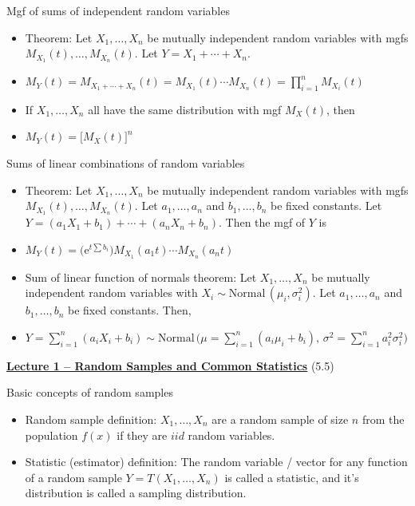 \documentclass{article}
\newcommand{\bu}[1]{\textbf{\ul{#1}}}				%
\newcommand{\e}{\mathrm{e}}		%
\newcommand{\follow}[1]{\sim \text{#1}\,}		%
\newcommand{\vecn}[2]{#1_1, \ldots, #1_{#2}}	%
\begin{document}
Mgf of sums of independent random variables
\begin{itemize}
    \item Theorem: Let $\vecn{X}{n}$ be mutually independent random variables with mgfs $M_{X_1}(t), \ldots, M_{X_n}(t)$. Let $Y = X_1 + \cdots + X_n$.
    \item[] $\displaystyle M_Y(t) = M_{X_1 + \cdots + X_n}(t) = M_{X_1}(t) \cdots M_{X_n}(t) = \prod_{i = 1}^n M_{X_i}(t)$
    \item[] If $\vecn{X}{n}$ all have the same distribution with mgf $M_X(t)$, then
    \item[] $M_Y(t) = \big[M_X(t)\big]^n$
\end{itemize}\bigskip

Sums of linear combinations of random variables
\begin{itemize}
     \item Theorem: Let $\vecn{X}{n}$ be mutually independent random variables with mgfs $M_{X_1}(t), \ldots, M_{X_n}(t)$. Let $\vecn{a}{n}$ and $\vecn{b}{n}$ be fixed constants. Let $Y = (a_1 X_1 + b_1) + \cdots + (a_n X_n + b_n)$. Then the mgf of $Y$ is
     \item[] $M_Y(t) = \big(\e^{t \sum b_i}\big) M_{X_1}(a_1 t) \cdots M_{X_n}(a_n t)$
     \item Sum of linear function of normals theorem: Let $\vecn{X}{n}$ be mutually independent random variables with $X_i \follow{Normal}(\mu_i, \sigma_i^2)$. Let $\vecn{a}{n}$ and $\vecn{b}{n}$ be fixed constants. Then,
     \item[] $\displaystyle Y =\sum_{i = 1}^n (a_i X_i + b_i) \follow{Normal}\bigg(\mu = \sum_{i = 1}^n (a_i \mu_i + b_i), \, \sigma^2 = \sum_{i = 1}^n a_i^2 \sigma_i^2\bigg)$
\end{itemize}\newpage

{\large \bu{Lecture 1 -- Random Samples and Common Statistics}} (5.5)\bigskip

Basic concepts of random samples
\begin{itemize}
    \item Random sample definition: $\vecn{X}{n}$ are a random sample of size $n$ from the population $f(x)$ if they are $iid$ random variables.
    \item Statistic (estimator) definition: The random variable / vector for any function of a random sample $Y = T(\vecn{X}{n})$ is called a statistic, and it's distribution is called a sampling distribution.
\end{itemize}\bigskip
\end{document}
